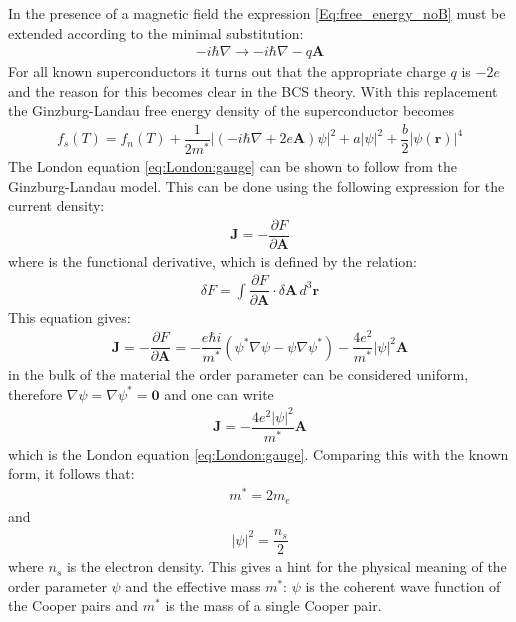 \documentclass[12pt,a4paper,oneside,openany]{book}
\begin{document}
In the presence of a magnetic field the expression \eqref{Eq:free_energy_noB} must be extended according to the minimal substitution:
\begin{align}
	-i \hbar \nabla \rightarrow  - i \hbar \nabla -q \mathbf{A}
\end{align}
For all known superconductors it turns out that the appropriate charge $q$ is $-2e$ and the reason for this becomes clear in the BCS theory. With this replacement the Ginzburg-Landau free energy density of the superconductor becomes
\begin{align}
	f_s(T) = f_n(T) + \dfrac{1}{2m^*}|(-i \hbar\nabla +2e \mathbf{A}) \psi |^2 + a |\psi|^2 +\dfrac{b}{2} |\psi (\mathbf{r})|^4
	\label{Eq:free_energy_B}
\end{align}
The London equation \eqref{eq:London:gauge} can be shown to follow from the Ginzburg-Landau model. This can be done using the following expression for the current density:
\begin{align}
	\mathbf{J} = - \dfrac{\partial F}{\partial \mathbf{A}}
	\label{eq_landau_supercurrent}
\end{align}
where is the functional derivative, which is defined by the relation:
\begin{align}
	\delta F = \int \dfrac{\partial F}{\partial \mathbf{A}} \cdot \delta \mathbf{A} \, d^3 \mathbf{r}
	\label{eq:functional_derivative}
\end{align}
This equation gives:
\begin{align}
	\mathbf{J} = - \dfrac{\partial F}{\partial \mathbf{A}} = -\dfrac{e \hbar i}{m^*} (\psi^* \nabla \psi - \psi \nabla \psi^*) - \dfrac{4e^2}{m^*} |\psi|^2 \mathbf{A}
\end{align}
in the bulk of the material the order parameter can be considered uniform, therefore $\nabla \psi = \nabla \psi^* = \mathbf{0}$ and one can write
\begin{align}
	\mathbf{J} = - \dfrac{4e^2|\psi|^2}{m^*} \mathbf{A}
\end{align}
which is the London equation \ref{eq:London:gauge}. Comparing this with the known form, it follows that:
\begin{align}
	m^* = 2m_e
\end{align}
and
\begin{align}
	|\psi|^2 = \dfrac{n_s}{2}
\end{align}
where $n_s$ is the electron density. This gives a hint for the physical meaning of the order parameter $\psi$ and the effective mass $m^*$: $\psi$ is the coherent wave function of the Cooper pairs and $m^*$ is the mass of a single Cooper pair.
\end{document}
